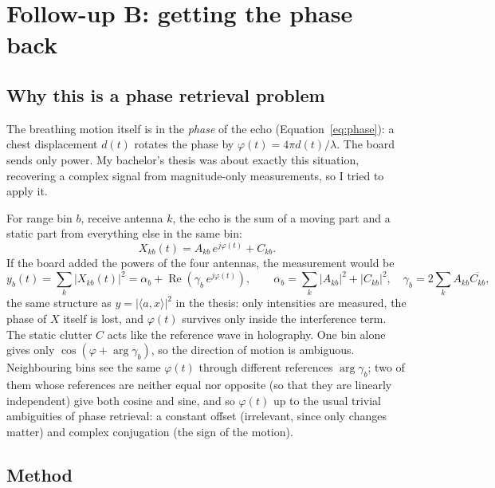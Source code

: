 \documentclass[11pt,a4paper]{article}
\begin{document}
\section{Follow-up B: getting the phase back}\label{sec:pr}

\subsection{Why this is a phase retrieval problem}

The breathing motion itself is in the \emph{phase} of the echo (Equation~\ref{eq:phase}): a chest displacement $d(t)$ rotates the phase by $\varphi(t) = 4\pi d(t)/\lambda$. The board sends only power. My bachelor's thesis was about exactly this situation, recovering a complex signal from magnitude-only measurements, so I tried to apply it.

For range bin $b$, receive antenna $k$, the echo is the sum of a moving part and a static part from everything else in the same bin:
\begin{equation}
X_{kb}(t) = A_{kb}\,e^{j\varphi(t)} + C_{kb}.
\end{equation}
If the board added the powers of the four antennas, the measurement would be
\begin{equation}
y_b(t) = \sum_k |X_{kb}(t)|^2 = \alpha_b + \operatorname{Re}\!\left(\gamma_b\,e^{j\varphi(t)}\right),\qquad
\alpha_b = \sum_k |A_{kb}|^2 + |C_{kb}|^2,\quad \gamma_b = 2\sum_k A_{kb}\overline{C_{kb}},
\label{eq:prmodel}
\end{equation}
the same structure as $y = |\langle a, x\rangle|^2$ in the thesis: only intensities are measured, the phase of $X$ itself is lost, and $\varphi(t)$ survives only inside the interference term. The static clutter $C$ acts like the reference wave in holography. One bin alone gives only $\cos(\varphi + \arg\gamma_b)$, so the direction of motion is ambiguous. Neighbouring bins see the same $\varphi(t)$ through different references $\arg\gamma_b$; two of them whose references are neither equal nor opposite (so that they are linearly independent) give both cosine and sine, and so $\varphi(t)$ up to the usual trivial ambiguities of phase retrieval: a constant offset (irrelevant, since only changes matter) and complex conjugation (the sign of the motion).

\subsection{Method}
\end{document}
